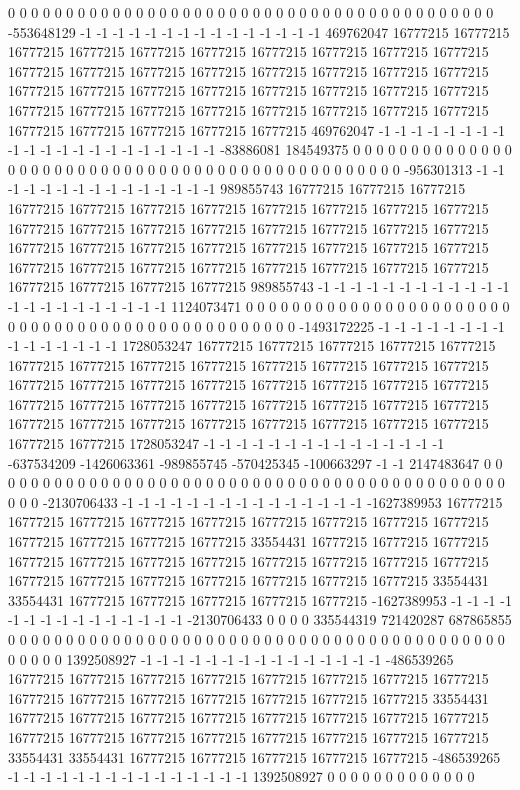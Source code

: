 0 0 0 0 0 0 0 0 0 0 0 0 0 0 0 0 0 0 0 0 0 0 0 0 0 0 0 0 0 0 0 0 0 0 0 0 0 0 0 0 0 0 -553648129 -1 -1 -1 -1 -1 -1 -1 -1 -1 -1 -1 -1 -1 -1 -1 469762047 16777215 16777215 16777215 16777215 16777215 16777215 16777215 16777215 16777215 16777215 16777215 16777215 16777215 16777215 16777215 16777215 16777215 16777215 16777215 16777215 16777215 16777215 16777215 16777215 16777215 16777215 16777215 16777215 16777215 16777215 16777215 16777215 16777215 16777215 16777215 16777215 16777215 16777215 16777215 469762047 -1 -1 -1 -1 -1 -1 -1 -1 -1 -1 -1 -1 -1 -1 -1 -1 -1 -1 -1 -1 -1 -83886081 184549375 0 0 0 0 0 0
0 0 0 0 0 0 0 0 0 0 0 0 0 0 0 0 0 0 0 0 0 0 0 0 0 0 0 0 0 0 0 0 0 0 0 0 0 0 0 0 0 0 -956301313 -1 -1 -1 -1 -1 -1 -1 -1 -1 -1 -1 -1 -1 -1 -1 989855743 16777215 16777215 16777215 16777215 16777215 16777215 16777215 16777215 16777215 16777215 16777215 16777215 16777215 16777215 16777215 16777215 16777215 16777215 16777215 16777215 16777215 16777215 16777215 16777215 16777215 16777215 16777215 16777215 16777215 16777215 16777215 16777215 16777215 16777215 16777215 16777215 16777215 16777215 16777215 989855743 -1 -1 -1 -1 -1 -1 -1 -1 -1 -1 -1 -1 -1 -1 -1 -1 -1 -1 -1 -1 -1 -1 1124073471 0 0 0 0 0 0
0 0 0 0 0 0 0 0 0 0 0 0 0 0 0 0 0 0 0 0 0 0 0 0 0 0 0 0 0 0 0 0 0 0 0 0 0 0 0 0 0 0 -1493172225 -1 -1 -1 -1 -1 -1 -1 -1 -1 -1 -1 -1 -1 -1 -1 1728053247 16777215 16777215 16777215 16777215 16777215 16777215 16777215 16777215 16777215 16777215 16777215 16777215 16777215 16777215 16777215 16777215 16777215 16777215 16777215 16777215 16777215 16777215 16777215 16777215 16777215 16777215 16777215 16777215 16777215 16777215 16777215 16777215 16777215 16777215 16777215 16777215 16777215 16777215 16777215 1728053247 -1 -1 -1 -1 -1 -1 -1 -1 -1 -1 -1 -1 -1 -1 -1 -637534209 -1426063361 -989855745 -570425345 -100663297 -1 -1 2147483647 0 0 0 0 0 0
0 0 0 0 0 0 0 0 0 0 0 0 0 0 0 0 0 0 0 0 0 0 0 0 0 0 0 0 0 0 0 0 0 0 0 0 0 0 0 0 0 0 -2130706433 -1 -1 -1 -1 -1 -1 -1 -1 -1 -1 -1 -1 -1 -1 -1 -1627389953 16777215 16777215 16777215 16777215 16777215 16777215 16777215 16777215 16777215 16777215 16777215 16777215 16777215 33554431 16777215 16777215 16777215 16777215 16777215 16777215 16777215 16777215 16777215 16777215 16777215 16777215 16777215 16777215 16777215 16777215 16777215 16777215 33554431 33554431 16777215 16777215 16777215 16777215 16777215 -1627389953 -1 -1 -1 -1 -1 -1 -1 -1 -1 -1 -1 -1 -1 -1 -1 -2130706433 0 0 0 0 335544319 721420287 687865855 0 0 0 0 0 0
0 0 0 0 0 0 0 0 0 0 0 0 0 0 0 0 0 0 0 0 0 0 0 0 0 0 0 0 0 0 0 0 0 0 0 0 0 0 0 0 0 0 1392508927 -1 -1 -1 -1 -1 -1 -1 -1 -1 -1 -1 -1 -1 -1 -1 -486539265 16777215 16777215 16777215 16777215 16777215 16777215 16777215 16777215 16777215 16777215 16777215 16777215 16777215 16777215 16777215 33554431 16777215 16777215 16777215 16777215 16777215 16777215 16777215 16777215 16777215 16777215 16777215 16777215 16777215 16777215 16777215 16777215 33554431 33554431 16777215 16777215 16777215 16777215 16777215 -486539265 -1 -1 -1 -1 -1 -1 -1 -1 -1 -1 -1 -1 -1 -1 -1 1392508927 0 0 0 0 0 0 0 0 0 0 0 0 0
